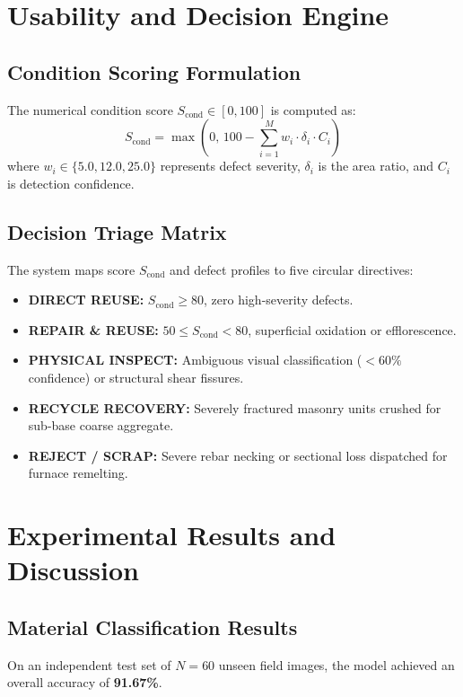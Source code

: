\documentclass[12pt,a4paper]{report}
\theoremstyle{definition}
\begin{document}
\chapter{Usability and Decision Engine}
\section{Condition Scoring Formulation}
The numerical condition score $S_{\text{cond}} \in [0, 100]$ is computed as:
\begin{equation}
S_{\text{cond}} = \max\left(0, \, 100 - \sum_{i=1}^{M} w_i \cdot \delta_i \cdot C_i \right)
\end{equation}
where $w_i \in \{5.0, 12.0, 25.0\}$ represents defect severity, $\delta_i$ is the area ratio, and $C_i$ is detection confidence.

\section{Decision Triage Matrix}
The system maps score $S_{\text{cond}}$ and defect profiles to five circular directives:
\begin{itemize}
    \item \textbf{DIRECT REUSE:} $S_{\text{cond}} \ge 80$, zero high-severity defects.
    \item \textbf{REPAIR \& REUSE:} $50 \le S_{\text{cond}} < 80$, superficial oxidation or efflorescence.
    \item \textbf{PHYSICAL INSPECT:} Ambiguous visual classification ($<60\%$ confidence) or structural shear fissures.
    \item \textbf{RECYCLE RECOVERY:} Severely fractured masonry units crushed for sub-base coarse aggregate.
    \item \textbf{REJECT / SCRAP:} Severe rebar necking or sectional loss dispatched for furnace remelting.
\end{itemize}

\chapter{Experimental Results and Discussion}
\section{Material Classification Results}
On an independent test set of $N=60$ unseen field images, the model achieved an overall accuracy of \textbf{91.67\%}.
\end{document}
